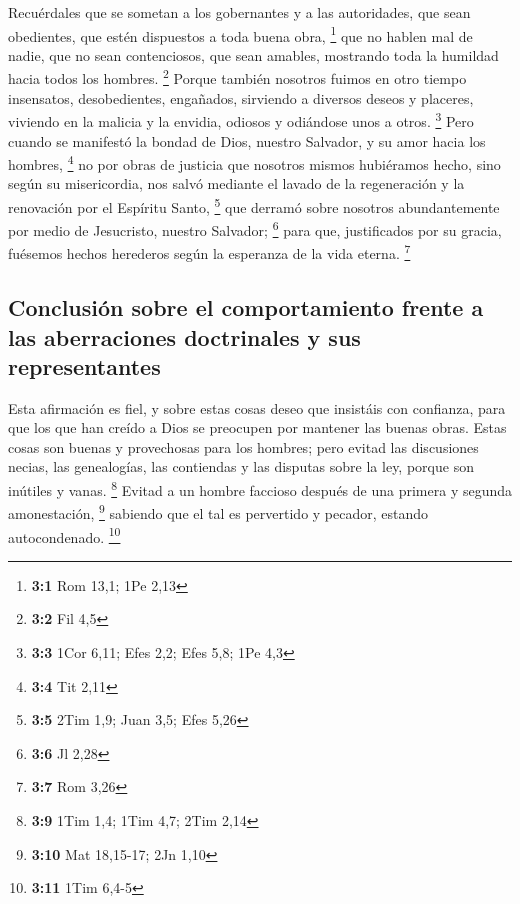 \begin{paracol}{2}
 Recuérdales que se sometan a los gobernantes y a las
autoridades, que sean obedientes, que estén dispuestos a toda buena
obra, \footnote{\textbf{3:1} Rom 13,1; 1Pe 2,13}  que no
hablen mal de nadie, que no sean contenciosos, que sean amables,
mostrando toda la humildad hacia todos los hombres. \footnote{\textbf{3:2}
  Fil 4,5}  Porque también nosotros fuimos en otro tiempo
insensatos, desobedientes, engañados, sirviendo a diversos deseos y
placeres, viviendo en la malicia y la envidia, odiosos y odiándose unos
a otros. \footnote{\textbf{3:3} 1Cor 6,11; Efes 2,2; Efes 5,8; 1Pe 4,3}
 Pero cuando se manifestó la bondad de Dios, nuestro
Salvador, y su amor hacia los hombres, \footnote{\textbf{3:4} Tit 2,11}
 no por obras de justicia que nosotros mismos hubiéramos
hecho, sino según su misericordia, nos salvó mediante el lavado de la
regeneración y la renovación por el Espíritu Santo, \footnote{\textbf{3:5}
  2Tim 1,9; Juan 3,5; Efes 5,26}  que derramó sobre
nosotros abundantemente por medio de Jesucristo, nuestro Salvador;
\footnote{\textbf{3:6} Jl 2,28}  para que, justificados
por su gracia, fuésemos hechos herederos según la esperanza de la vida
eterna. \footnote{\textbf{3:7} Rom 3,26}

\hypertarget{conclusiuxf3n-sobre-el-comportamiento-frente-a-las-aberraciones-doctrinales-y-sus-representantes}{%
\subsection{Conclusión sobre el comportamiento frente a las aberraciones
doctrinales y sus
representantes}\label{conclusiuxf3n-sobre-el-comportamiento-frente-a-las-aberraciones-doctrinales-y-sus-representantes}}

 Esta afirmación es fiel, y sobre estas cosas deseo que
insistáis con confianza, para que los que han creído a Dios se preocupen
por mantener las buenas obras. Estas cosas son buenas y provechosas para
los hombres;  pero evitad las discusiones necias, las
genealogías, las contiendas y las disputas sobre la ley, porque son
inútiles y vanas. \footnote{\textbf{3:9} 1Tim 1,4; 1Tim 4,7; 2Tim 2,14}
 Evitad a un hombre faccioso después de una primera y
segunda amonestación, \footnote{\textbf{3:10} Mat 18,15-17; 2Jn 1,10}
 sabiendo que el tal es pervertido y pecador, estando
autocondenado. \footnote{\textbf{3:11} 1Tim 6,4-5}

\hypertarget{comentarios-personales-finales-uxfaltimos-pedidos-y-saludos}{%
}
\end{paracol}
